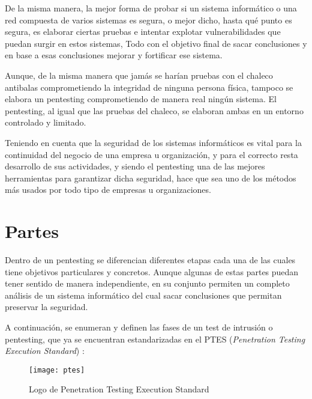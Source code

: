 De la misma manera, la mejor forma de probar si un sistema informático o una red compuesta de varios sistemas es segura, o mejor dicho, hasta qué punto es segura, es elaborar ciertas pruebas e intentar explotar vulnerabilidades que puedan surgir en estos sistemas, Todo con el objetivo final de sacar conclusiones y en base a esas conclusiones mejorar y fortificar ese sistema.

Aunque, de la misma manera que jamás se harían pruebas con el chaleco antibalas comprometiendo la integridad de ninguna persona física, tampoco se elabora un pentesting comprometiendo de manera real ningún sistema. El pentesting, al igual que las pruebas del chaleco, se elaboran ambas en un entorno controlado y limitado.

Teniendo en cuenta que la seguridad de los sistemas informáticos es vital para la continuidad del negocio de una empresa u organización, y para el correcto resta desarrollo de sus actividades, y siendo el pentesting una de las mejores herramientas para garantizar dicha seguridad, hace que sea uno de los métodos más usados por todo tipo de empresas u organizaciones.



\section{Partes}

Dentro de un pentesting se diferencian diferentes etapas cada una de las cuales tiene objetivos particulares y concretos. Aunque algunas de estas partes puedan tener sentido de manera independiente, en su conjunto permiten un completo análisis de un sistema informático del cual sacar conclusiones que permitan preservar la seguridad.

A continuación, se enumeran y definen las fases de un test de intrusión o pentesting, que ya se encuentran estandarizadas en el PTES (\textit{Penetration Testing Execution Standard}) \cite{ptes}:

\begin{figure}[H]
	\centering
	\texttt{[image: ptes]}
	\caption{Logo de Penetration Testing Execution Standard}
	\label{fig:ptes}
\end{figure}

